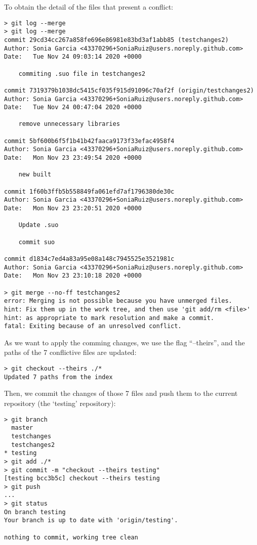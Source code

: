\documentclass[]{book}
\begin{document}
To obtain the detail of the files that present a conflict:

\begin{verbatim}
> git log --merge
> git log --merge
commit 29cd34cc267a858fe696e86981e83bd3af1abb85 (testchanges2)
Author: Sonia Garcia <43370296+SoniaRuiz@users.noreply.github.com>
Date:   Tue Nov 24 09:03:14 2020 +0000

    commiting .suo file in testchanges2

commit 7319379b1038dc5415cf035f915d91096c70af2f (origin/testchanges2)
Author: Sonia Garcia <43370296+SoniaRuiz@users.noreply.github.com>
Date:   Tue Nov 24 00:47:04 2020 +0000

    remove unnecessary libraries

commit 5bf600b6f5f1b41b42faaca9173f33efac4958f4
Author: Sonia Garcia <43370296+SoniaRuiz@users.noreply.github.com>
Date:   Mon Nov 23 23:49:54 2020 +0000

    new built

commit 1f60b3ffb5b558849fa061efd7af1796380de30c
Author: Sonia Garcia <43370296+SoniaRuiz@users.noreply.github.com>
Date:   Mon Nov 23 23:20:51 2020 +0000

    Update .suo

    commit suo

commit d1834c7ed4a83a95e08a148c7945525e3521981c
Author: Sonia Garcia <43370296+SoniaRuiz@users.noreply.github.com>
Date:   Mon Nov 23 23:10:18 2020 +0000

> git merge --no-ff testchanges2
error: Merging is not possible because you have unmerged files.
hint: Fix them up in the work tree, and then use 'git add/rm <file>'
hint: as appropriate to mark resolution and make a commit.
fatal: Exiting because of an unresolved conflict.
\end{verbatim}

As we want to apply the comming changes, we use the flag ``--theirs'',
and the paths of the 7 conflictive files are updated:

\begin{verbatim}
> git checkout --theirs ./*
Updated 7 paths from the index
\end{verbatim}

Then, we commit the changes of those 7 files and push them to the
current repository (the `testing' repository):

\begin{verbatim}
> git branch
  master
  testchanges
  testchanges2
* testing
> git add ./*
> git commit -m "checkout --theirs testing"
[testing bcc3b5c] checkout --theirs testing
> git push
...
> git status
On branch testing
Your branch is up to date with 'origin/testing'.

nothing to commit, working tree clean
\end{verbatim}
\end{document}

